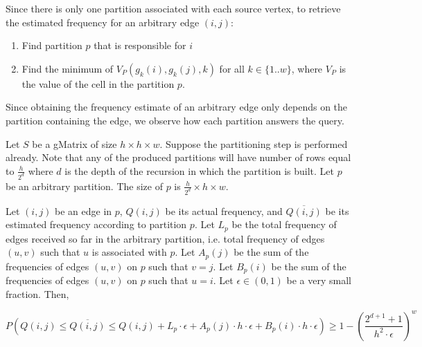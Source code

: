 Since there is only one partition associated with each source vertex, to retrieve the estimated frequency for an arbitrary edge $(i,j)$:

\begin{enumerate}
  \item Find partition $p$ that is responsible for $i$
  \item Find the minimum of $V_P(g_k(i),g_k(j),k)$ for all $k \in \{1..w\}$, where $V_P$ is the value of the cell in the partition $p$. 
\end{enumerate}

Since obtaining the frequency estimate of an arbitrary edge only depends on the partition containing the edge, we observe how each partition answers the query.

Let $S$ be a gMatrix of size $h\times h\times w$. Suppose the partitioning step is performed already. Note that any of the produced partitions will have number of rows equal to $\frac{h}{2^d}$ where $d$ is the depth of the recursion in which the partition is built. Let $p$ be an arbitrary partition. The size of $p$ is $\frac{h}{2^d}\times h\times w$.

\begin{theorem}
\label{thm:efreqguarantee}
Let $(i,j)$ be an edge in $p$, $Q(i,j)$ be its actual frequency, and $\overline{Q(i,j)}$ be its estimated frequency according to partition $p$. Let $L_p$ be the total frequency of edges received so far in the arbitrary partition, i.e. total frequency of edges $(u,v)$ such that $u$ is associated with $p$. Let $A_p(j)$ be the sum of the frequencies of edges $(u,v)$ on $p$ such that $v=j$. Let $B_p(i)$ be the sum of the frequencies of edges $(u,v)$ on $p$ such that $u=i$. Let $\epsilon \in (0,1)$ be a very small fraction. Then,
  
  \[
P(Q(i,j) \leq \overline{Q(i,j)} \leq Q(i,j) + L_p \cdot \epsilon + A_p(j) \cdot h \cdot \epsilon + B_p(i) \cdot h \cdot \epsilon) \geq 1-(\frac{2^{d+1}+1}{h^2\cdot\epsilon})^w
\]

\end{theorem}

